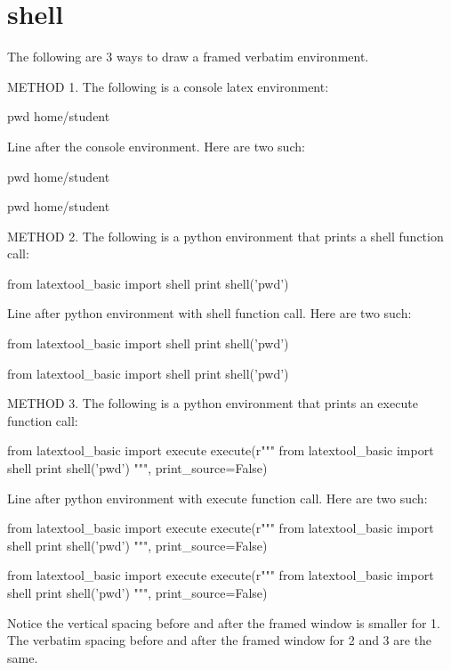 \section{shell}

The following are 3 ways to draw a framed verbatim environment.

METHOD 1.
The following is a console latex environment:
\begin{console}
 pwd
home/student
\end{console}
Line after the console environment.
Here are two such:
\begin{console}
 pwd
home/student
\end{console}
\begin{console}
 pwd
home/student
\end{console}


METHOD 2.
The following is a python environment that prints a shell function call:
\begin{python}
from latextool_basic import shell
print shell('pwd')
\end{python}
Line after python environment with shell function call.
Here are two such:
\begin{python}
from latextool_basic import shell
print shell('pwd')
\end{python}
\begin{python}
from latextool_basic import shell
print shell('pwd')
\end{python}

METHOD 3.
The following is a python environment that prints an execute function call:
\begin{python}
from latextool_basic import execute
execute(r"""
from latextool_basic import shell
print shell('pwd')
""", print_source=False)
\end{python}
Line after python environment with execute function call.
Here are two such:
\begin{python}
from latextool_basic import execute
execute(r"""
from latextool_basic import shell
print shell('pwd')
""", print_source=False)
\end{python}
\begin{python}
from latextool_basic import execute
execute(r"""
from latextool_basic import shell
print shell('pwd')
""", print_source=False)
\end{python}


Notice the vertical spacing before and after the framed window is smaller
for 1. 
The verbatim spacing before and after the framed window for 2 and 3 are
the same.


